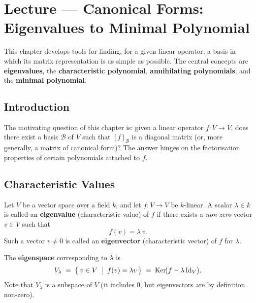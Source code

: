 \section{Lecture — Canonical Forms: Eigenvalues to Minimal Polynomial}
This chapter develops tools for finding, for a given linear operator, a basis in which its matrix representation is as simple as possible. The central concepts are \textbf{eigenvalues}, the \textbf{characteristic polynomial}, \textbf{annihilating polynomials}, and the \textbf{minimal polynomial}.
\subsection{Introduction}
The motivating question of this chapter is: given a linear operator $f: V \to V$, does there exist a basis $\mathcal{B}$ of $V$ such that $[f]_{\mathcal{B}}$ is a diagonal matrix (or, more generally, a matrix of canonical form)?  The answer hinges on the factorisation properties of certain polynomials attached to $f$.
\subsection{Characteristic Values}

\begin{defbox}
Let $V$ be a vector space over a field $k$, and let $f: V \to V$
be $k$-linear.  A scalar $\lambda \in k$ is called an
\textbf{eigenvalue} (characteristic value) of $f$ if there exists a
\emph{non-zero} vector $v \in V$ such that
\[
  f(v) = \lambda\, v.
\]
Such a vector $v \neq 0$ is called an \textbf{eigenvector}
(characteristic vector) of $f$ for $\lambda$.

\medskip
The \textbf{eigenspace} corresponding to $\lambda$ is
\[
  V_\lambda \;=\; \bigl\{\, v \in V \;\bigm|\; f(v) = \lambda v \,\bigr\}
       \;=\; \operatorname{Ker}\!\bigl(f - \lambda\,\mathrm{Id}_V\bigr).
\]
Note that $V_\lambda$ is a subspace of $V$ (it includes $0$, but eigenvectors
are by definition non-zero).
\end{defbox}

